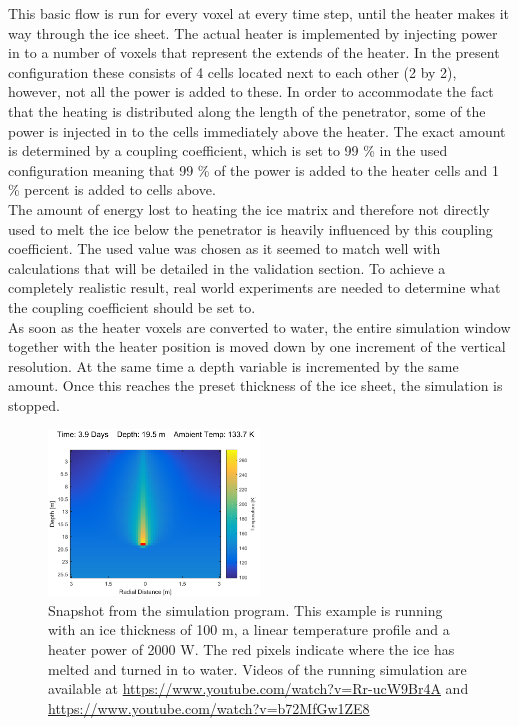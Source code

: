 \noindent
This basic flow is run for every voxel at every time step, until the heater makes it way through the ice sheet. The actual heater is implemented by injecting power in to a number of voxels that represent the extends of the heater. In the present configuration these consists of 4 cells located next to each other (2 by 2), however, not all the power is added to these. In order to accommodate the fact that the heating is distributed along the length of the penetrator, some of the power is injected in to the cells immediately above the heater. The exact amount is determined by a coupling coefficient, which is set to 99 \% in the used configuration meaning that 99 \% of the power is added to the heater cells and 1 \% percent is added to cells above. \\

\noindent
The amount of energy lost to heating the ice matrix and therefore not directly used to melt the ice below the penetrator is heavily influenced by this coupling coefficient. The used value was chosen as it seemed to match well with calculations that will be detailed in the validation section. To achieve a completely realistic result, real world experiments are needed to determine what the coupling coefficient should be set to.\\

\noindent
As soon as the heater voxels are converted to water, the entire simulation window together with the heater position is moved down by one increment of the vertical resolution. At the same time a depth variable is incremented by the same amount. Once this reaches the preset thickness of the ice sheet, the simulation is stopped. \\

 \begin{figure}[ht]
 	\centering
 	\includegraphics[width=0.5\textwidth]{figures/LAMC/snapshot.pdf}
 	\caption{Snapshot from the simulation program. This example is running with an ice thickness of 100 m, a linear temperature profile and a heater power of 2000 W. The red pixels indicate where the ice has melted and turned in to water. Videos of the running simulation are available at \url{https://www.youtube.com/watch?v=Rr-ucW9Br4A} and \url{https://www.youtube.com/watch?v=b72MfGw1ZE8}}
 	\label{fig:simSnapshot}
 \end{figure}

